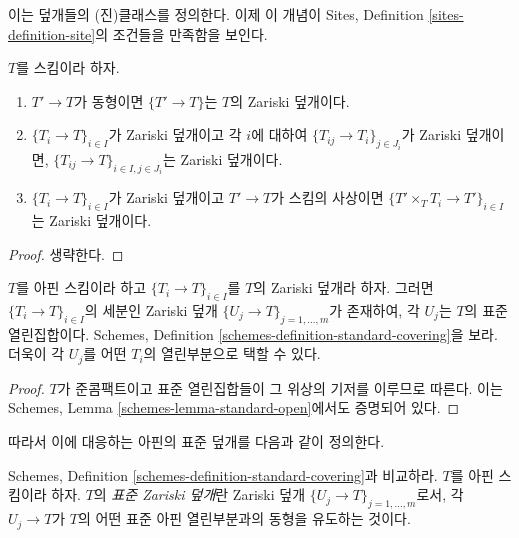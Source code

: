 \noindent
이는 덮개들의 (진)클래스를 정의한다. 이제 이 개념이
Sites, Definition \ref{sites-definition-site}의 조건들을 만족함을 보인다.

\begin{lemma}
\label{lemma-zariski}
$T$를 스킴이라 하자.
\begin{enumerate}
\item $T' \to T$가 동형이면 $\{T' \to T\}$는 $T$의 Zariski 덮개이다.
\item $\{T_i \to T\}_{i\in I}$가 Zariski 덮개이고 각 $i$에 대하여
$\{T_{ij} \to T_i\}_{j\in J_i}$가 Zariski 덮개이면,
$\{T_{ij} \to T\}_{i \in I, j\in J_i}$는 Zariski 덮개이다.
\item $\{T_i \to T\}_{i\in I}$가 Zariski 덮개이고 $T' \to T$가
스킴의 사상이면 $\{T' \times_T T_i \to T'\}_{i\in I}$는 Zariski
덮개이다.
\end{enumerate}
\end{lemma}

\begin{proof}
생략한다.
\end{proof}

\begin{lemma}
\label{lemma-zariski-affine}
$T$를 아핀 스킴이라 하고 $\{T_i \to T\}_{i \in I}$를 $T$의 Zariski
덮개라 하자. 그러면 $\{T_i \to T\}_{i \in I}$의 세분인 Zariski 덮개
$\{U_j \to T\}_{j = 1, \ldots, m}$가 존재하여, 각 $U_j$는 $T$의
표준 열린집합이다. Schemes, Definition
\ref{schemes-definition-standard-covering}을 보라. 더욱이 각 $U_j$를
어떤 $T_i$의 열린부분으로 택할 수 있다.
\end{lemma}

\begin{proof}
$T$가 준콤팩트이고 표준 열린집합들이 그 위상의 기저를 이루므로
따른다. 이는 Schemes, Lemma \ref{schemes-lemma-standard-open}에서도
증명되어 있다.
\end{proof}

\noindent
따라서 이에 대응하는 아핀의 표준 덮개를 다음과 같이 정의한다.

\begin{definition}
\label{definition-standard-Zariski}
Schemes, Definition \ref{schemes-definition-standard-covering}과 비교하라.
$T$를 아핀 스킴이라 하자. $T$의 {\it 표준 Zariski 덮개}란 Zariski 덮개
$\{U_j \to T\}_{j = 1, \ldots, m}$로서, 각 $U_j \to T$가 $T$의 어떤
표준 아핀 열린부분과의 동형을 유도하는 것이다.
\end{definition}

